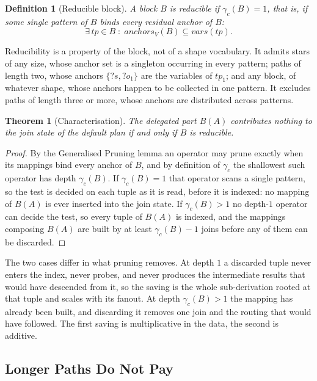 \documentclass{article}
\newtheorem{theorem}{Theorem}
\newtheorem{definition}{Definition}
\begin{document}
\begin{definition}[Reducible block]
A block $B$ is \emph{reducible} if $\gamma_c(B) = 1$, that is, if some single pattern of
$B$ binds every residual anchor of $B$:
\[
\exists\, tp \in B \;:\; \mathit{anchors}_V(B) \subseteq \mathit{vars}(tp).
\]
\end{definition}

Reducibility is a property of the block, not of a shape vocabulary. It admits stars of
any size, whose anchor set is a singleton occurring in every pattern; paths of length
two, whose anchors $\{?s, ?o_1\}$ are the variables of $tp_1$; and any block, of whatever
shape, whose anchors happen to be collected in one pattern. It excludes paths of length
three or more, whose anchors are distributed across patterns.

\begin{theorem}[Characterisation]
The delegated part $B(A)$ contributes nothing to the join state of the default plan if
and only if $B$ is reducible.
\end{theorem}

\begin{proof}
By the Generalised Pruning lemma an operator may prune exactly when its mappings bind
every anchor of $B$, and by definition of $\gamma_c$ the shallowest such operator has
depth $\gamma_c(B)$. If $\gamma_c(B) = 1$ that operator scans a single pattern, so the
test is decided on each tuple as it is read, before it is indexed: no mapping of $B(A)$
is ever inserted into the join state. If $\gamma_c(B) > 1$ no depth-$1$ operator can
decide the test, so every tuple of $B(A)$ is indexed, and the mappings composing $B(A)$
are built by at least $\gamma_c(B) - 1$ joins before any of them can be discarded.
\end{proof}

The two cases differ in what pruning removes. At depth $1$ a discarded tuple never enters
the index, never probes, and never produces the intermediate results that would have
descended from it, so the saving is the whole sub-derivation rooted at that tuple and
scales with its fanout. At depth $\gamma_c(B) > 1$ the mapping has already been built,
and discarding it removes one join and the routing that would have followed. The first
saving is multiplicative in the data, the second is additive.

\subsection{Longer Paths Do Not Pay}
\end{document}
